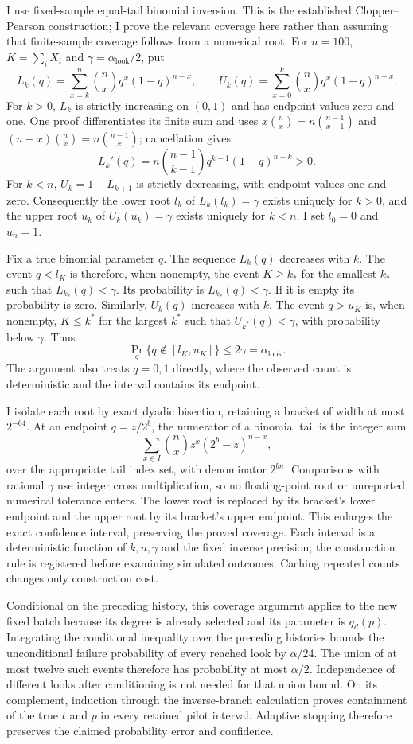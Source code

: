 \documentclass[11pt]{article}
\begin{document}
I use fixed-sample equal-tail binomial inversion. This is the established
Clopper--Pearson construction; I prove the relevant coverage here rather
than assuming that finite-sample coverage follows from a numerical root.
For $n=100$, $K=\sum_iX_i$ and $\gamma=\alpha_{\mathrm{look}}/2$, put
\[
 L_k(q)=\sum_{x=k}^n\binom nxq^x(1-q)^{n-x},\qquad
 U_k(q)=\sum_{x=0}^k\binom nxq^x(1-q)^{n-x}.
\]
For $k>0$, $L_k$ is strictly increasing on $(0,1)$ and has endpoint
values zero and one. One proof differentiates its finite sum and uses
$x\binom nx=n\binom{n-1}{x-1}$ and
$(n-x)\binom nx=n\binom{n-1}{x}$; cancellation gives
\[
 L_k'(q)=n\binom{n-1}{k-1}q^{k-1}(1-q)^{n-k}>0.
\]
For $k<n$, $U_k=1-L_{k+1}$ is strictly decreasing, with endpoint
values one and zero. Consequently the lower root $l_k$ of
$L_k(l_k)=\gamma$ exists uniquely for $k>0$, and the upper root
$u_k$ of $U_k(u_k)=\gamma$ exists uniquely for $k<n$. I set
$l_0=0$ and $u_n=1$.

Fix a true binomial parameter $q$. The sequence $L_k(q)$ decreases
with $k$. The event $q<l_K$ is therefore, when nonempty, the event
$K\geq k_*$ for the smallest $k_*$ such that $L_{k_*}(q)<\gamma$.
Its probability is $L_{k_*}(q)<\gamma$. If it is empty its probability
is zero. Similarly, $U_k(q)$ increases with $k$. The event $q>u_K$
is, when nonempty, $K\leq k^*$ for the largest $k^*$ such that
$U_{k^*}(q)<\gamma$, with probability below $\gamma$. Thus
\[
 \Pr_q\{q\notin[l_K,u_K]\}\leq2\gamma
 =\alpha_{\mathrm{look}}.
\]
The argument also treats $q=0,1$ directly, where the observed count is
deterministic and the interval contains its endpoint.

I isolate each root by exact dyadic bisection, retaining a bracket of
width at most $2^{-64}$. At an endpoint $q=z/2^b$, the numerator of a
binomial tail is the integer sum
\[
 \sum_{x\in I}\binom nxz^x(2^b-z)^{n-x},
\]
over the appropriate tail index set, with denominator $2^{bn}$.
Comparisons with rational $\gamma$ use integer cross multiplication,
so no floating-point root or unreported numerical tolerance enters.
The lower root is replaced by its bracket's lower endpoint and the
upper root by its bracket's upper endpoint. This enlarges the exact
confidence interval, preserving the proved coverage. Each interval is a
deterministic function of $k,n,\gamma$ and the fixed inverse precision;
the construction rule is registered before examining simulated outcomes.
Caching repeated counts changes only construction cost.

Conditional on the preceding history, this coverage argument applies
to the new fixed batch because its degree is already selected and its
parameter is $q_d(p)$. Integrating the conditional inequality over the preceding histories
bounds the unconditional failure probability of every reached look by
$\alpha/24$. The union of at most twelve such events therefore has
probability at most $\alpha/2$. Independence of different looks after
conditioning is not needed for that union bound. On its complement,
induction through the inverse-branch calculation proves containment of
the true $t$ and $p$ in every retained pilot interval. Adaptive stopping
therefore preserves the claimed probability error and confidence.
\end{document}
